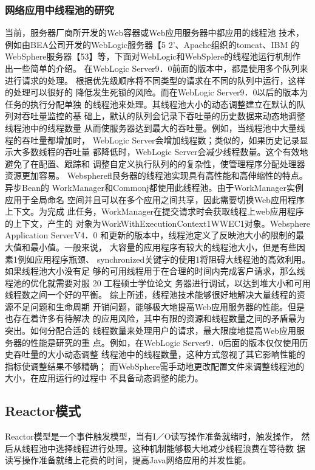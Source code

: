 \subsubsection*{网络应用中线程池的研究}
当前，服务器厂商所开发的Web容器或Web应用服务器中都应用的线程池
技术，例如由BEA公司开发的WebLogic服务器【5 2’、Apache组织的tomcat、IBM
的WebSphere服务器【53】等，下面对WebLogic和WebSplere的线程池运行机制作
出一些简单的介绍。
在WebLogic Server9．0前面的版本中，都是使用多个队列来进行请求的处理。
根据优先级顺序将不同类型的请求在不同的队列中运行，这样的处理可以很好的
降低发生死锁的风险。而在WebLogic Server9．0以后的版本为任务的执行分配单独
的线程池来处理。其线程池大小的动态调整建立在默认的队列对吞吐量监控的基
础上，默认的队列会记录下吞吐量的历史数据来动态地调整线程池中的线程数量
从而使服务器达到最大的吞吐量。例如，当线程池中大量线程的吞吐量都增加时，
WebLogic Server会增加线程数；类似的，如果历史记录显示大多数线程的吞吐量
都降低时，WebLogic Server会减少线程数量。这个有效地避免了在配置、跟踪和
调整自定义执行队列的的复杂性，使管理程序分配处理器资源更加容易。
Webspherefl艮务器的线程池实现具有高性能和高伸缩性的特点。异步Bean的
WorkManager和Commonj都使用此线程池。由于WorkManager实例应用于全局命名
空间并且可以在多个应用之间共享，因此需要切换Web应用程序上下文。为完成
此任务，WorkManager在提交请求时会获取线程上web应用程序的上下文，产生的
对象为WorkWithExecutionContext1WWEC1对象。Websphere Application ServerV4．0
和更新的版本中，线程池定义了反映池大小的限制的最大值和最小值。一般来说，
大容量的应用程序有较大的线程池大小，但是有些因素1例如应用程序瓶颈、
synchronized关键字的使用1将阻碍大线程池的高效利用。如果线程池大小没有足
够的可用线程用于在合理的时间内完成客户请求，那么线程池的优化就需要对服
20
工程硕士学位论文
务器进行调试，以达到堆大小和可用线程数之间一个好的平衡。
综上所述，线程池技术能够很好地解决大量线程的资源不足问题和生命周期
开销问题，能够极大地提高Web应用服务器的性能。但是也存在着许多有待解决
的应用风险，其中有限的资源和线程数量之间的矛盾最为突出。如何分配合适的
线程数量来处理用户的请求，最大限度地提高Web应用服务器的性能是研究的重
点。例如，在WebLogic Server9．0后面的版本仅仅使用历史吞吐量的大小动态调整
线程池中的线程数量，这种方式忽视了其它影响性能的指标使调整结果不够精确；
而WebSphere需手动地更改配置文件来调整线程池的大小，在应用运行的过程中
不具备动态调整的能力。
\subsection*{Reactor模式}
Reactor模型是一个事件触发模型，当有I／O读写操作准备就绪时，触发操作，
然后从线程池中选择线程进行处理。这种机制能够极大地减少线程浪费在等待数
据读写操作准备就绪上花费的时间，提高Java网络应用的并发性能。
